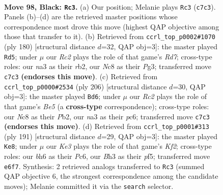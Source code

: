 \documentclass[11pt]{article}
\begin{document}
\clearpage

\begin{figure}[p]\centering
\begin{subfigure}{0.46\textwidth}\centering
\resizebox{\linewidth}{!}{%
\newchessgame
\chessboard[
  setfen={2n4K/2r5/p3k2B/P4p1p/8/N5Pb/8/R7 b - - 7 98},
  showmover=false,
  pgfstyle=straightmove, color=movearrow, markmove={c7-c3}
]}
\caption{}
\end{subfigure}\hfill
\begin{subfigure}{0.46\textwidth}\centering
\resizebox{\linewidth}{!}{%
\newchessgame
\chessboard[
  setfen={7k/3R4/4Bp2/7p/4P2P/6P1/1r3b2/3K4 w - - 9 91},
  showmover=false,
  pgfstyle=straightmove, color=movearrow, markmove={d7-d5}
]}
\caption{}
\end{subfigure}
\\[4pt]
\begin{subfigure}{0.46\textwidth}\centering
\resizebox{\linewidth}{!}{%
\newchessgame
\chessboard[
  setfen={3k4/8/p1p1n1p1/4B3/P3P2P/5K2/1P6/8 w - - 7 104},
  showmover=false,
  pgfstyle=straightmove, color=movearrow, markmove={e5-d6}
]}
\caption{}
\end{subfigure}\hfill
\begin{subfigure}{0.46\textwidth}\centering
\resizebox{\linewidth}{!}{%
\newchessgame
\chessboard[
  setfen={8/5k2/p1p2p2/P3pP1K/8/Bp6/1N1n4/8 b - - 3 96},
  showmover=false,
  pgfstyle=straightmove, color=movearrow, markmove={f7-e8}
]}
\caption{}
\end{subfigure}
\caption{\textbf{Move 98, Black: \texttt{Rc3}.} (a) Our position; Melanie plays \texttt{Rc3} (\texttt{c7c3}). Panels (b)--(d) are the retrieved master positions whose correspondence most drove this move (highest QAP objective among those that transfer to it). (b) Retrieved from \texttt{ccrl\_top\_p0002\#1070} (ply 180) [structural distance $d$=32, QAP obj=3]: the master played \texttt{Rd5}; under $\mu$ our \emph{Rc2} plays the role of that game's \emph{Rd7}; cross-type roles: our \emph{n}a3 as their \emph{r}b2, our \emph{N}c8 as their \emph{P}g3; transferred move \texttt{c7c3} \textbf{(endorses this move)}. (c) Retrieved from \texttt{ccrl\_top\_p0000\#2534} (ply 206) [structural distance $d$=30, QAP obj=3]: the master played \texttt{Bd6}; under $\mu$ our \emph{Rc2} plays the role of that game's \emph{Be5} (a \textbf{cross-type} correspondence); cross-type roles: our \emph{N}c8 as their \emph{P}b2, our \emph{n}a3 as their \emph{p}c6; transferred move \texttt{c7c3} \textbf{(endorses this move)}. (d) Retrieved from \texttt{ccrl\_top\_p0001\#313} (ply 191) [structural distance $d$=29, QAP obj=3]: the master played \texttt{Ke8}; under $\mu$ our \emph{Ke3} plays the role of that game's \emph{Kf2}; cross-type roles: our \emph{b}h6 as their \emph{P}c6, our \emph{B}h3 as their \emph{p}f5; transferred move \texttt{e6f7}. Synthesis: 2 retrieved analogs transferred to \texttt{Rc3} (summed QAP objective 6, the strongest correspondence among the candidate moves); Melanie committed it via the \texttt{search} selector.}
\label{fig:thought-m195}
\end{figure}
\end{document}
